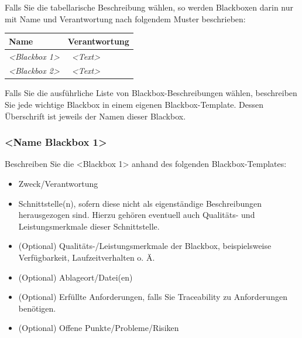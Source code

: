 \documentclass[]{article}
\begin{document}
Falls Sie die tabellarische Beschreibung wählen, so werden Blackboxen
darin nur mit Name und Verantwortung nach folgendem Muster beschrieben:

\begin{longtable}[]{@{}ll@{}}
\toprule
\begin{minipage}[b]{0.31\columnwidth}\raggedright
\textbf{Name}\strut
\end{minipage} & \begin{minipage}[b]{0.63\columnwidth}\raggedright
\textbf{Verantwortung}\strut
\end{minipage}\tabularnewline
\midrule
\endhead
\begin{minipage}[t]{0.31\columnwidth}\raggedright
\emph{\textless{}Blackbox 1\textgreater{}}\strut
\end{minipage} & \begin{minipage}[t]{0.63\columnwidth}\raggedright
~\emph{\textless{}Text\textgreater{}}\strut
\end{minipage}\tabularnewline
\begin{minipage}[t]{0.31\columnwidth}\raggedright
\emph{\textless{}Blackbox 2\textgreater{}}\strut
\end{minipage} & \begin{minipage}[t]{0.63\columnwidth}\raggedright
~\emph{\textless{}Text\textgreater{}}\strut
\end{minipage}\tabularnewline
\bottomrule
\end{longtable}

Falls Sie die ausführliche Liste von Blackbox-Beschreibungen wählen,
beschreiben Sie jede wichtige Blackbox in einem eigenen
Blackbox-Template. Dessen Überschrift ist jeweils der Namen dieser
Blackbox.

\hypertarget{__name_blackbox_1}{%
\subsubsection{\textless{}Name Blackbox
1\textgreater{}}\label{__name_blackbox_1}}

Beschreiben Sie die \textless{}Blackbox 1\textgreater{} anhand des
folgenden Blackbox-Templates:

\begin{itemize}
\item
  Zweck/Verantwortung
\item
  Schnittstelle(n), sofern diese nicht als eigenständige Beschreibungen
  herausgezogen sind. Hierzu gehören eventuell auch Qualitäts- und
  Leistungsmerkmale dieser Schnittstelle.
\item
  (Optional) Qualitäts-/Leistungsmerkmale der Blackbox, beispielsweise
  Verfügbarkeit, Laufzeitverhalten o. Ä.
\item
  (Optional) Ablageort/Datei(en)
\item
  (Optional) Erfüllte Anforderungen, falls Sie Traceability zu
  Anforderungen benötigen.
\item
  (Optional) Offene Punkte/Probleme/Risiken
\end{itemize}
\end{document}
